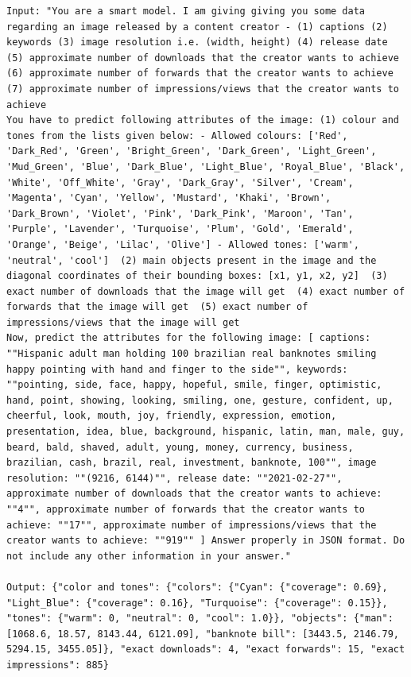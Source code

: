\begin{lstlisting}[caption={Engagement Finetuning Verbalization Pattern (2): Noisy engagement in input and asking the model to correct the noise in addition to producing content},frame=single,label={EngageNet:verbalization-2},basicstyle=\scriptsize]
Input: "You are a smart model. I am giving giving you some data regarding an image released by a content creator - (1) captions (2) keywords (3) image resolution i.e. (width, height) (4) release date (5) approximate number of downloads that the creator wants to achieve (6) approximate number of forwards that the creator wants to achieve (7) approximate number of impressions/views that the creator wants to achieve
You have to predict following attributes of the image: (1) colour and tones from the lists given below: - Allowed colours: ['Red', 'Dark_Red', 'Green', 'Bright_Green', 'Dark_Green', 'Light_Green', 'Mud_Green', 'Blue', 'Dark_Blue', 'Light_Blue', 'Royal_Blue', 'Black', 'White', 'Off_White', 'Gray', 'Dark_Gray', 'Silver', 'Cream', 'Magenta', 'Cyan', 'Yellow', 'Mustard', 'Khaki', 'Brown', 'Dark_Brown', 'Violet', 'Pink', 'Dark_Pink', 'Maroon', 'Tan', 'Purple', 'Lavender', 'Turquoise', 'Plum', 'Gold', 'Emerald', 'Orange', 'Beige', 'Lilac', 'Olive'] - Allowed tones: ['warm', 'neutral', 'cool']  (2) main objects present in the image and the diagonal coordinates of their bounding boxes: [x1, y1, x2, y2]  (3) exact number of downloads that the image will get  (4) exact number of forwards that the image will get  (5) exact number of impressions/views that the image will get
Now, predict the attributes for the following image: [ captions: ""Hispanic adult man holding 100 brazilian real banknotes smiling happy pointing with hand and finger to the side"", keywords: ""pointing, side, face, happy, hopeful, smile, finger, optimistic, hand, point, showing, looking, smiling, one, gesture, confident, up, cheerful, look, mouth, joy, friendly, expression, emotion, presentation, idea, blue, background, hispanic, latin, man, male, guy, beard, bald, shaved, adult, young, money, currency, business, brazilian, cash, brazil, real, investment, banknote, 100"", image resolution: ""(9216, 6144)"", release date: ""2021-02-27"", approximate number of downloads that the creator wants to achieve: ""4"", approximate number of forwards that the creator wants to achieve: ""17"", approximate number of impressions/views that the creator wants to achieve: ""919"" ] Answer properly in JSON format. Do not include any other information in your answer."

Output: {"color and tones": {"colors": {"Cyan": {"coverage": 0.69}, "Light_Blue": {"coverage": 0.16}, "Turquoise": {"coverage": 0.15}}, "tones": {"warm": 0, "neutral": 0, "cool": 1.0}}, "objects": {"man": [1068.6, 18.57, 8143.44, 6121.09], "banknote bill": [3443.5, 2146.79, 5294.15, 3455.05]}, "exact downloads": 4, "exact forwards": 15, "exact impressions": 885}

\end{lstlisting}



